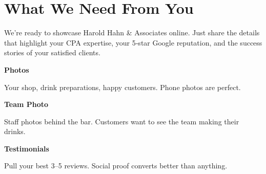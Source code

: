 \documentclass[11pt,letterpaper]{article}
\begin{document}
\vspace{0.2em}

\section*{What We Need From You}

We’re ready to showcase Harold Hahn & Associates online. Just share the details that highlight your CPA expertise, your 5‑star Google reputation, and the success stories of your satisfied clients.

\vspace{0.12em}

\noindent\begin{minipage}[t]{0.48\textwidth}
\begin{tcolorbox}[colframe=accent-teal, boxrule=1pt, left=0.7em, right=0.7em, top=0.5em, bottom=0.5em, arc=4pt, boxsep=0pt]
{\bfseries\small\color{accent-teal}Photos}

\vspace{0.15em}

{\small Your shop, drink preparations, happy customers. Phone photos are perfect.}
\end{tcolorbox}

\vspace{0.1em}

\begin{tcolorbox}[colframe=accent-teal, boxrule=1pt, left=0.7em, right=0.7em, top=0.5em, bottom=0.5em, arc=4pt, boxsep=0pt]
{\bfseries\small\color{accent-teal}Team Photo}

\vspace{0.15em}

{\small Staff photos behind the bar. Customers want to see the team making their drinks.}
\end{tcolorbox}

\vspace{0.1em}

\begin{tcolorbox}[colframe=accent-teal, boxrule=1pt, left=0.7em, right=0.7em, top=0.5em, bottom=0.5em, arc=4pt, boxsep=0pt]
{\bfseries\small\color{accent-teal}Testimonials}

\vspace{0.15em}

{\small Pull your best 3--5 reviews. Social proof converts better than anything.}
\end{tcolorbox}
\end{minipage}
\hfill
\end{document}

